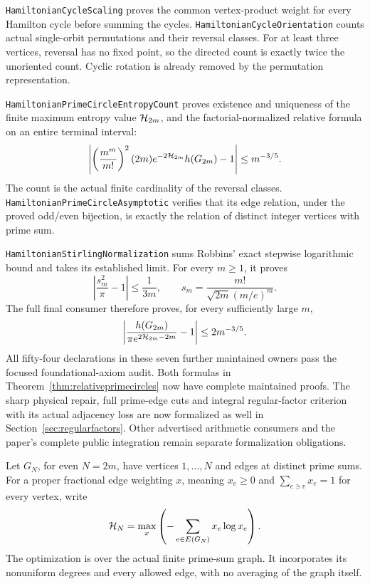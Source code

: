 \texttt{HamiltonianCycleScaling} proves the common vertex-product
weight for every Hamilton cycle before summing the cycles.
\texttt{HamiltonianCycleOrientation} counts actual single-orbit
permutations and their reversal classes. For at least three
vertices, reversal has no fixed point, so the directed count is
exactly twice the unoriented count. Cyclic rotation is already
removed by the permutation representation.

\texttt{HamiltonianPrimeCircleEntropyCount} proves existence and
uniqueness of the finite maximum entropy value \({\cal H}_{2m}\),
and the factorial-normalized relative formula on an entire
terminal interval:
\[
 \left|\left(\frac{m^m}{m!}\right)^2
       (2m)e^{-2{\cal H}_{2m}}h(G_{2m})-1\right|
                                    \leq m^{-3/5}.
\]
The count is the actual finite cardinality of the reversal
classes. \texttt{HamiltonianPrimeCircleAsymptotic} verifies that
its edge relation, under the proved odd/even bijection, is exactly
the relation of distinct integer vertices with prime sum.

\texttt{HamiltonianStirlingNormalization} sums Robbins' exact
stepwise logarithmic bound and takes its established limit.
For every \(m\geq1\), it proves
\[
 \left|\frac{s_m^2}{\pi}-1\right|\leq\frac1{3m},
 \qquad s_m=\frac{m!}{\sqrt{2m}(m/e)^m}.
\]
The full final consumer therefore proves, for every sufficiently
large \(m\),
\[
 \left|\frac{h(G_{2m})}
              {\pi e^{2{\cal H}_{2m}-2m}}-1\right|
                                    \leq 2m^{-3/5}.
\]
All fifty-four declarations in these seven further maintained
owners pass the focused foundational-axiom audit.
Both formulas in Theorem~\ref{thm:relativeprimecircles} now have
complete maintained proofs. The sharp physical repair, full
prime-edge cuts and integral regular-factor criterion with its
actual adjacency loss are now formalized as well in
Section~\ref{sec:regularfactors}. Other advertised arithmetic
consumers and the paper's complete public integration remain
separate formalization obligations.

Let \(G_N\), for even \(N=2m\), have vertices \(1,\ldots,N\)
and edges at distinct prime sums.
For a proper fractional edge weighting \(x\), meaning
\(x_e\geq0\) and \(\sum_{e\ni v}x_e=1\) for every vertex,
write
\[
 {\cal H}_N=\max_x\left(-\sum_{e\in E(G_N)}x_e\log x_e\right).
\]
The optimization is over the actual finite prime-sum graph.
It incorporates its nonuniform degrees and every allowed
edge, with no averaging of the graph itself.

